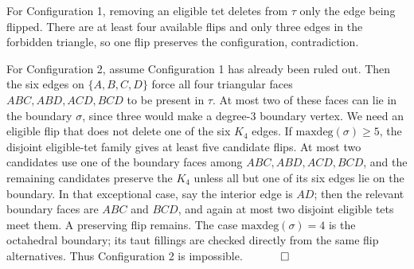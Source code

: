 \documentclass[12pt]{article}
\newcommand{\proofend}{$\quad \qed$}
\newcommand{\kw}{\mathrm}
\newcommand{\maxdeg}{\kw{maxdeg}}
\begin{document}
For Configuration 1, removing an eligible tet deletes from $\tau$ only
the edge being flipped.  There are at least four available flips and only
three edges in the forbidden triangle, so one flip preserves the
configuration, contradiction.

For Configuration 2, assume Configuration 1 has already been ruled out.
Then the six edges on $\{A,B,C,D\}$ force all four triangular faces
$ABC,ABD,ACD,BCD$ to be present in $\tau$.
At most two of these faces can lie in the boundary $\sigma$, since three
would make a degree-$3$ boundary vertex.
We need an eligible flip that does not delete one of the six $K_4$ edges.
If $\maxdeg(\sigma)\geq 5$, the disjoint eligible-tet family gives at
least five candidate flips.  At most two candidates use one of the
boundary faces among $ABC,ABD,ACD,BCD$, and the remaining candidates
preserve the $K_4$ unless all but one of its six edges lie on the
boundary.  In that exceptional case, say the interior edge is $AD$;
then the relevant boundary faces are $ABC$ and $BCD$, and again at most
two disjoint eligible tets meet them.  A preserving flip remains.
The case $\maxdeg(\sigma)=4$ is the octahedral boundary; its taut
fillings are checked directly from the same flip alternatives.
Thus Configuration 2 is impossible.
\proofend



\end{document}
